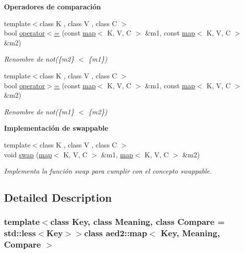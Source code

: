 \begin{Indent}{\bf \-Operadores de comparación}
\begin{DoxyCompactItemize}
{\footnotesize template$<$class K , class V , class C $>$ }\\bool \hyperlink{classaed2_1_1map_afe374b37f17263d0cad3ee19a590d208}{operator$<$=} (const \hyperlink{classaed2_1_1map}{map}$<$ \-K, \-V, \-C $>$ \&m1, const \hyperlink{classaed2_1_1map}{map}$<$ \-K, \-V, \-C $>$ \&m2)
\begin{DoxyCompactList}\small\item\em \-Renombre de not(\{m2\} $<$ \{m1\}) \end{DoxyCompactList}\item 
{\footnotesize template$<$class K , class V , class C $>$ }\\bool \hyperlink{classaed2_1_1map_a093a6d1a055339c5fc6297a1d47a9159}{operator$>$=} (const \hyperlink{classaed2_1_1map}{map}$<$ \-K, \-V, \-C $>$ \&m1, const \hyperlink{classaed2_1_1map}{map}$<$ \-K, \-V, \-C $>$ \&m2)
\begin{DoxyCompactList}\small\item\em \-Renombre de not(\{m1\} $<$ \{m2\}) \end{DoxyCompactList}\end{DoxyCompactItemize}
\end{Indent}
\begin{Indent}{\bf \-Implementación de swappable}\par
\begin{DoxyCompactItemize}
\item 
{\footnotesize template$<$class K , class V , class C $>$ }\\void \hyperlink{classaed2_1_1map_a119cb2938bbc11c25ebd4fb824782a72}{swap} (\hyperlink{classaed2_1_1map}{map}$<$ \-K, \-V, \-C $>$ \&m1, \hyperlink{classaed2_1_1map}{map}$<$ \-K, \-V, \-C $>$ \&m2)
\begin{DoxyCompactList}\small\item\em \-Implementa la función swap para cumplir con el concepto swappable. \end{DoxyCompactList}\end{DoxyCompactItemize}
\end{Indent}


\subsection{\-Detailed \-Description}
\subsubsection*{template$<$class \-Key, class \-Meaning, class \-Compare = std\-::less$<$\-Key$>$$>$class aed2\-::map$<$ Key, Meaning, Compare $>$}

